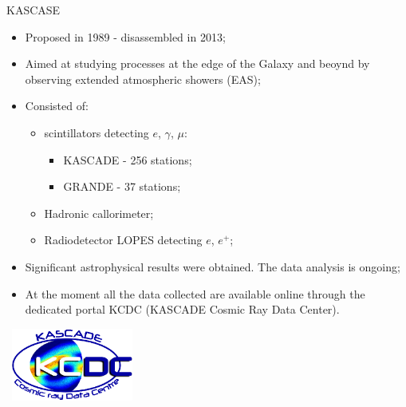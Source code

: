 \begin{frame}{KASCASE}
\begin{itemize}
 \item Proposed in 1989 - disassembled in 2013;
 \item Aimed at studying processes at the edge of the Galaxy and beoynd by observing extended atmospheric showers (EAS);
 \item Consisted of:
 \begin{itemize}
  \item scintillators detecting $e$, $\gamma$, $\mu$:
 \begin{itemize}
    \item KASCADE - 256 stations;
    \item GRANDE - 37 stations;
 \end{itemize}
    \item Hadronic callorimeter;
    \item Radiodetector LOPES detecting $e$, $e^{+}$;
 \end{itemize}
  \item Significant astrophysical results were obtained. The data analysis is ongoing;
  \item At the moment all the data collected are available online through the dedicated portal KCDC (KASCADE Cosmic Ray Data Center).
\end{itemize}

\parbox[t][0pt]{0pt}{
  \vspace{-0.6\textheight}
  ~\hspace{0.68\textwidth}\includegraphics[width=0.3\textwidth]{pics/KCDC-logo.png}
}
\end{frame}

